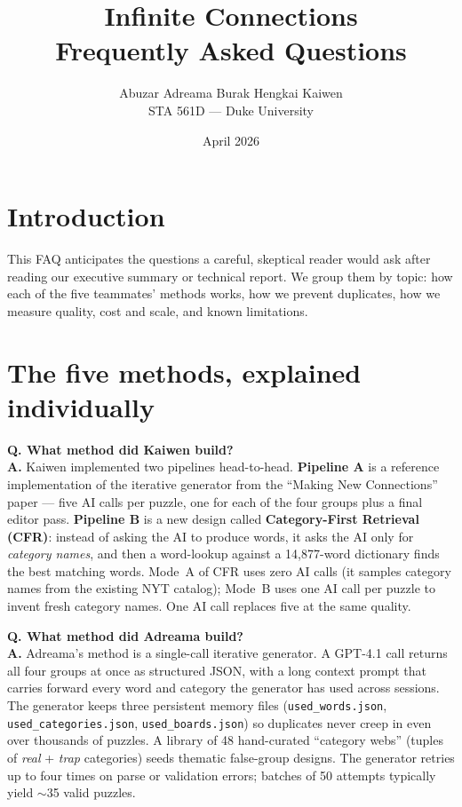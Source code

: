 \documentclass[11pt, letterpaper]{article}
\title{\textbf{Infinite Connections}\\[0.2em]
\large Frequently Asked Questions}
\author{Abuzar \quad Adreama \quad Burak \quad Hengkai \quad Kaiwen\\
STA 561D --- Duke University}
\date{April 2026}
\newcommand{\qitem}[1]{\vspace{0.6em}\noindent\textbf{\color{accent}Q. #1}\\[0.2em]}
\newcommand{\aitem}{\noindent\textbf{A.} }
\begin{document}
\maketitle
\thispagestyle{fancy}
\vspace{-2em}

\section*{Introduction}
This FAQ anticipates the questions a careful, skeptical reader would ask after
reading our executive summary or technical report. We group them by topic: how
each of the five teammates' methods works, how we prevent duplicates, how we
measure quality, cost and scale, and known limitations.

\section*{The five methods, explained individually}

\qitem{What method did Kaiwen build?}
\aitem
Kaiwen implemented two pipelines head-to-head. \textbf{Pipeline A} is a
reference implementation of the iterative generator from the ``Making New
Connections'' paper --- five AI calls per puzzle, one for each of the four
groups plus a final editor pass. \textbf{Pipeline B} is a new design called
\textbf{Category-First Retrieval (CFR)}: instead of asking the AI to produce
words, it asks the AI only for \emph{category names}, and then a word-lookup
against a 14{,}877-word dictionary finds the best matching words. Mode~A of
CFR uses zero AI calls (it samples category names from the existing NYT
catalog); Mode~B uses one AI call per puzzle to invent fresh category names.
One AI call replaces five at the same quality.

\qitem{What method did Adreama build?}
\aitem
Adreama's method is a single-call iterative generator. A GPT-4.1 call returns
all four groups at once as structured JSON, with a long context prompt that
carries forward every word and category the generator has used across
sessions. The generator keeps three persistent memory files
(\texttt{used\_words.json}, \texttt{used\_categories.json},
\texttt{used\_boards.json}) so duplicates never creep in even over thousands
of puzzles. A library of 48 hand-curated ``category webs'' (tuples of
\textit{real} + \textit{trap} categories) seeds thematic false-group designs.
The generator retries up to four times on parse or validation errors; batches
of 50 attempts typically yield $\sim$35 valid puzzles.
\end{document}
